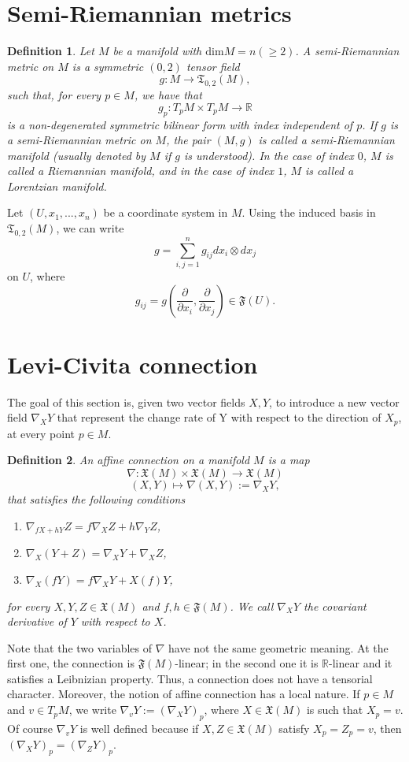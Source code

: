 \documentclass[11pt]{book}
\newtheorem{defi}{Definition}[chapter]
\def\R{\mathbb R}
\def\t{\mathfrak T}
\def\F{\mathfrak F}
\def\x{\mathfrak X}
\begin{document}
\section{Semi-Riemannian metrics}
\begin{defi}
	Let $M$ be a manifold with $\text{dim}M=n(\ge 2)$. A semi-Riemannian metric on $M$ is a symmetric  $(0,2)$ tensor field
	\[
	g:M\to \t_{0,2}(M),
	\]
	such that, for every $p\in M$, we have that
	\[
	g_p : T_pM \times T_pM \to \R
	\]
	is a non-degenerated symmetric bilinear form with index independent of $p$. If $g$ is a semi-Riemannian metric on $M$, the pair $(M,g)$ is called a semi-Riemannian manifold (usually denoted by $M$ if $g$ is understood).
	In the case of index $0$, $M$ is called a Riemannian manifold, and in the case of index $1$, $M$ is called a Lorentzian manifold.
\end{defi}

Let $(U,x_1,...,x_n)$ be a coordinate system in $M$. Using the induced basis in $\t_{0,2}(M)$, we can write
\[
g=\sum_{i,j=1}^{n} g_{ij} dx_i \otimes dx_j
\]
on $U$, where 
\[
g_{ij}=g\left(\frac{\partial}{\partial x_i},\frac{\partial}{\partial x_j}\right)\in \F(U).
\]
\section{Levi-Civita connection}
The goal of this section is, given two vector fields $X,Y$, to introduce a new vector field $\nabla_X Y$ that represent the change rate of Y with respect to the direction of $X_p$, at every point $p\in M$. 
\begin{defi}\label{conexion LC}
	An affine connection on a manifold $M$ is a map
	\[
	\nabla: \x(M) \times \x(M) \to \x(M)
	\]
	\[
	(X,Y)\longmapsto \nabla(X,Y):=\nabla_X Y,
	\]
	that satisfies the following conditions
	\begin{enumerate}
		\item $\nabla_{fX+hY} Z=f\nabla_X Z + h\nabla_Y Z$,
		\item $\nabla_X (Y+Z)=\nabla_X Y +\nabla_X Z$,
		\item $\nabla_X (fY)=f\nabla_X Y + X(f) Y$,
	\end{enumerate}
	for every $X,Y,Z\in \x(M)$ and $f,h\in \F(M)$. We call $\nabla_X Y$ the covariant derivative of $Y$ with respect to $X$.
\end{defi}

Note that the two variables of $\nabla$ have not the same geometric meaning. At the first one, the connection is $\F(M)$-linear; in the second one it is $\R$-linear and it satisfies a Leibnizian property. Thus, a connection does not have a tensorial character. Moreover, the notion of affine connection has a local nature. 
If $p\in M$ and $v\in T_pM$, we write $\nabla_{v} Y:=\left(\nabla_{X} Y\right)_p$, where $X\in \x(M)$ is such that $X_p=v$. Of course $\nabla_{v} Y$ is well defined because if $X,Z\in\x(M)$ satisfy $X_p=Z_p=v$, then $\left(\nabla_{X} Y\right)_p=\left(\nabla_{Z} Y\right)_p$.
\end{document}
